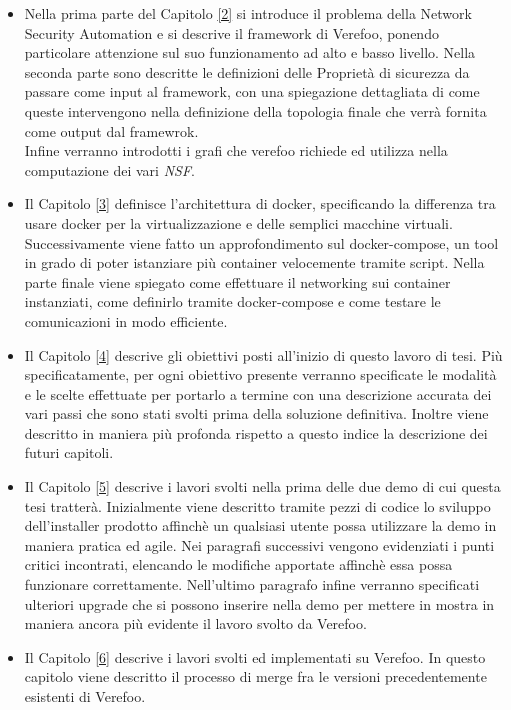 \begin{itemize}
    \item Nella prima parte del Capitolo \hyperref[ch:verefoo]{[2]} si introduce il problema della Network Security Automation e si descrive il framework di Verefoo, ponendo particolare attenzione sul suo funzionamento ad alto e basso livello.
        Nella seconda parte sono descritte  le  definizioni delle Proprietà di sicurezza da passare come input al framework, con una spiegazione dettagliata
        di come queste intervengono nella definizione della topologia finale che verrà fornita come output dal framewrok. \\
        Infine verranno introdotti i grafi che verefoo richiede ed utilizza nella computazione dei vari \textit{NSF}.
    \item Il Capitolo \hyperref[ch:docker]{[3]} definisce l'architettura di docker, specificando la differenza tra usare docker per la virtualizzazione e delle semplici macchine virtuali. Successivamente
          viene fatto un approfondimento sul docker-compose, un tool in grado di poter istanziare più container velocemente tramite script. Nella parte finale viene spiegato come effettuare il networking
          sui container instanziati, come definirlo tramite docker-compose e come testare le comunicazioni in modo efficiente.
    \item Il Capitolo \hyperref[ch:ThesisObj]{[4]} descrive gli obiettivi posti all'inizio di questo lavoro di tesi. Più specificatamente, per ogni obiettivo presente verranno specificate le modalità e le scelte effettuate per portarlo a termine con una descrizione accurata dei vari passi che sono stati svolti prima della soluzione definitiva.
          Inoltre viene descritto in maniera più profonda rispetto a questo indice la descrizione dei futuri capitoli.
    \item Il Capitolo \hyperref[ch:ThesisObj]{[5]} descrive i lavori svolti nella prima delle due demo di cui questa tesi tratterà. Inizialmente viene descritto tramite pezzi di codice lo sviluppo dell'installer prodotto affinchè un qualsiasi utente possa
          utilizzare la demo in maniera pratica ed agile. Nei paragrafi successivi vengono evidenziati i punti critici incontrati, elencando le modifiche apportate affinchè essa possa funzionare correttamente.
          Nell'ultimo paragrafo infine verranno specificati ulteriori upgrade che si possono inserire nella demo per mettere in mostra in maniera ancora più evidente il lavoro svolto da Verefoo.
    \item Il Capitolo \hyperref[ch:intro]{[6]} descrive i lavori svolti ed implementati su Verefoo. In questo capitolo viene descritto il processo di merge fra le versioni precedentemente esistenti di Verefoo.

\end{itemize}
